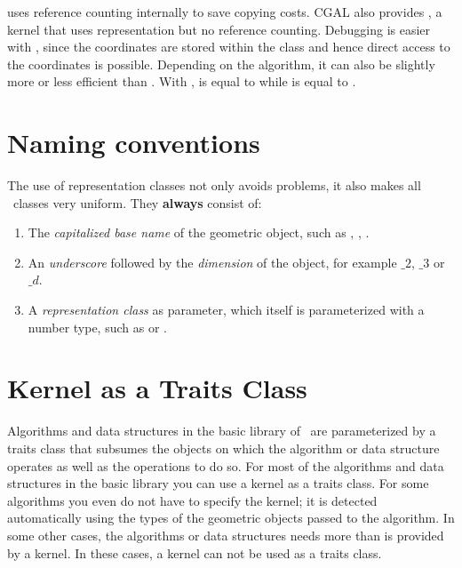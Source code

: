  uses reference counting internally to save
copying costs. CGAL also provides , a
kernel that uses  representation but no reference
counting.  Debugging is easier with ,
since the coordinates are stored within the class and hence direct access to
the coordinates is possible.  Depending on the algorithm, it can also be
slightly more or less efficient than .
With ,
 is equal to
 while
 is equal to .

\section{Naming conventions}

The use of representation classes not only avoids problems, it
also makes all \cgal\ classes very uniform. They {\bf always} consist of:
\begin{enumerate}
\begin{ccTexOnly}
\itemsep0pt\parskip0pt
\end{ccTexOnly}


\item The {\em capitalized base name} of the geometric object, such as 
      , , .

\item An {\em underscore} followed by the {\em dimension} of the object, 
      for example $\_2$, $\_3$ or $\_d$.

\item A {\em representation class} as parameter, which itself is
      parameterized with a number type, such as  
      or .
\end{enumerate}

\section{Kernel as a Traits Class}
Algorithms and data structures in the basic library of \cgal\ are parameterized 
by a traits class that subsumes the objects on which the algorithm or data
structure operates as well as the operations to do so. For most of the 
algorithms and data structures in the basic library you can use a kernel
as a traits class. For some algorithms you even do not have to specify
the kernel; it is detected automatically using the types of the geometric
objects passed to the algorithm. In some other cases, the algorithms 
or data structures needs more than is provided by a kernel. In these
cases, a kernel can not be used as a traits class.

